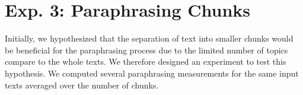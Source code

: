 \section{Exp. 3: Paraphrasing Chunks}

Initially, we hypothesized that the separation of text into smaller chunks would be beneficial for the paraphrasing process due to the limited number of topics compare to the whole texts.
We therefore designed an experiment to test this hypothesis.
We computed several paraphrasing measurements for the same input texts averaged over the number of chunks.


\begin{table}[]
\centering
\caption{Impact of the number of chunks on syntactic and semantic paraphrase measures.
Impact is measured in absolute changes between the measure for one chunk and the maximum number of chunks.
There is no great effect on one-step approaches or on the \dataGutenberg{}.
Bold values denote the extremest changes.
Syntactic measures should be small while semantic values should be positive.}
\label{tab:impact_chunks_dataset_paraphraser}
\end{table}

